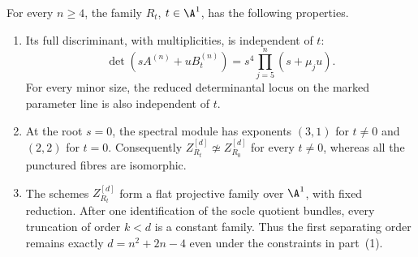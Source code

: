 \begin{theorem}
\label{thm:rank-preserving-specialization}
For every \(n\ge4\), the family \(R_t\), \(t\in\A^1\),
has the following properties.
\begin{enumerate}
\item Its full discriminant, with multiplicities, is independent of \(t\):
\begin{equation}\label{eq:fixed-discriminant-specialization}
 \det(sA^{(n)}+uB_t^{(n)})
       =s^4\prod_{j=5}^n(s+\mu_j u).
\end{equation}
For every minor size, the reduced determinantal locus on the marked
parameter line is also independent of \(t\).
\item At the root \(s=0\), the spectral module has exponents
\((3,1)\) for \(t\ne0\) and \((2,2)\) for \(t=0\).
Consequently \(Z_{R_t}^{[d]}\not\simeq Z_{R_0}^{[d]}\)
for every \(t\ne0\), whereas all the punctured fibres are isomorphic.
\item The schemes \(Z_{R_t}^{[d]}\) form a flat projective family
over \(\A^1\), with fixed reduction.  After one identification
of the socle quotient bundles, every truncation of order \(k<d\)
is a constant family.  Thus the first separating order remains
exactly \(d=n^2+2n-4\) even under the constraints in part~(1).
\end{enumerate}
\end{theorem}
